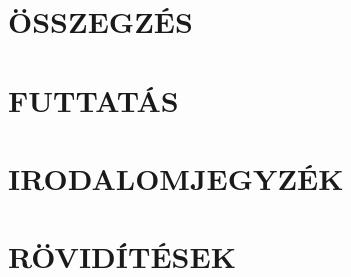 \documentclass[12pt,a4paper]{article}
\begin{document}
\clearpage
\section{ÖSSZEGZÉS}


\clearpage
\section{FUTTATÁS}





\clearpage
\section{IRODALOMJEGYZÉK}
\printbibliography[heading=none]

\clearpage
\renewcommand{\listfigurename}{ÁBRAJEGYZÉK}
\listoffigures

\clearpage
\renewcommand{\listtablename}{TÁBLAJEGYZÉK}
\listoftables

\clearpage
\section{RÖVIDÍTÉSEK}

\end{document}
